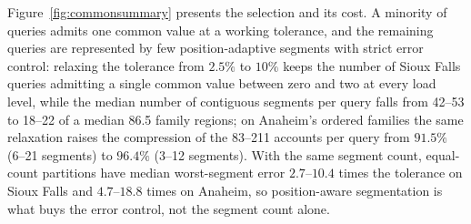 Figure~\ref{fig:commonsummary} presents the selection and its cost. A minority of queries admits one common value at a working tolerance, and the remaining queries are represented by few position-adaptive segments with strict error control: relaxing the tolerance from $2.5\%$ to $10\%$ keeps the number of Sioux Falls queries admitting a single common value between zero and two at every load level, while the median number of contiguous segments per query falls from 42--53 to 18--22 of a median 86.5 family regions; on Anaheim's ordered families the same relaxation raises the compression of the 83--211 accounts per query from $91.5\%$ (6--21 segments) to $96.4\%$ (3--12 segments). With the same segment count, equal-count partitions have median worst-segment error $2.7$--$10.4$ times the tolerance on Sioux Falls and $4.7$--$18.8$ times on Anaheim, so position-aware segmentation is what buys the error control, not the segment count alone.

